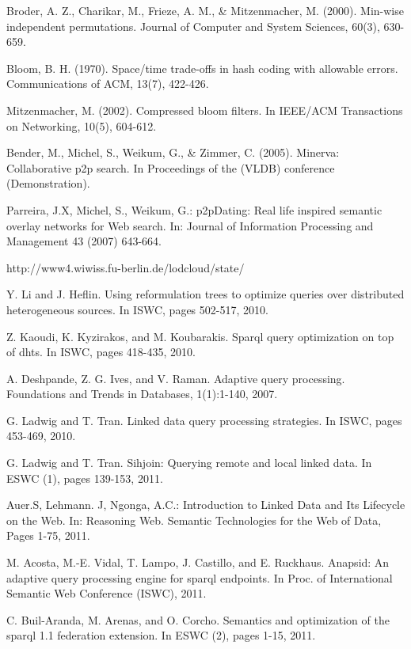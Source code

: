 \documentclass{sig-alternate}  %
\begin{document}
\begin{thebibliography}{10}
Broder, A. Z., Charikar, M., Frieze, A. M., \& Mitzenmacher,
M. (2000). Min-wise independent permutations. Journal of Computer
and System Sciences, 60(3), 630-659.

Bloom, B. H. (1970). Space/time trade-offs in hash
coding with allowable errors. Communications of ACM, 13(7), 422-426.

Mitzenmacher, M. (2002). Compressed bloom filters.
In IEEE/ACM Transactions on Networking, 10(5), 604-612.

Bender, M., Michel, S., Weikum, G., \& Zimmer, C.
(2005). Minerva: Collaborative p2p search. In Proceedings of the (VLDB)
conference (Demonstration).

Parreira, J.X, Michel, S., Weikum, G.: p2pDating:
Real life inspired semantic overlay networks for Web search. In: Journal
of Information Processing and Management 43 (2007) 643-664.

 http://www4.wiwiss.fu-berlin.de/lodcloud/state/

Y. Li and J. Hefl{}in. Using reformulation trees
to optimize queries over distributed heterogeneous sources. In ISWC,
pages 502-517, 2010.

Z. Kaoudi, K. Kyzirakos, and M. Koubarakis. Sparql
query optimization on top of dhts. In ISWC, pages 418-435, 2010.

A. Deshpande, Z. G. Ives, and V. Raman. Adaptive
query processing. Foundations and Trends in Databases, 1(1):1-140,
2007.

 G. Ladwig and T. Tran. Linked data query processing
strategies. In ISWC, pages 453-469, 2010.

G. Ladwig and T. Tran. Sihjoin: Querying remote and
local linked data. In ESWC (1), pages 139-153, 2011.

Auer.S, Lehmann. J, Ngonga, A.C.: Introduction to
Linked Data and Its Lifecycle on the Web. In: Reasoning Web. Semantic
Technologies for the Web of Data, Pages 1-75, 2011.

M. Acosta, M.-E. Vidal, T. Lampo, J. Castillo, and
E. Ruckhaus. Anapsid: An adaptive query processing engine for sparql
endpoints. In Proc. of International Semantic Web Conference (ISWC),
2011.

C. Buil-Aranda, M. Arenas, and O. Corcho. Semantics
and optimization of the sparql 1.1 federation extension. In ESWC (2),
pages 1-15, 2011.


\end{thebibliography}
\end{document}
